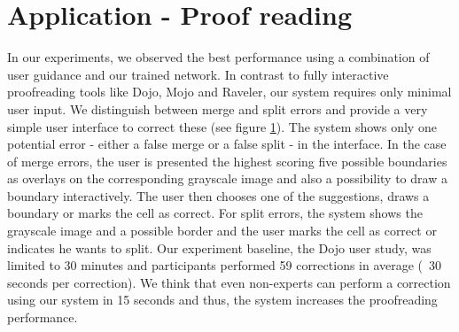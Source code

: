 \section{Application - Proof reading}

In our experiments, we observed the best performance using a combination of user guidance and our trained network. In contrast to fully interactive proofreading tools like Dojo, Mojo and Raveler, our system requires only minimal user input. We distinguish between merge and split errors and provide a very simple user interface to correct these (see figure \ref{fig:system}).
The system shows only one potential error - either a false merge or a false split - in the interface. In the case of merge errors, the user is presented the highest scoring five possible boundaries as overlays on the corresponding grayscale image and also a possibility to draw a boundary interactively. The user then chooses one of the suggestions, draws a boundary or marks the cell as correct.  For split errors, the system shows the grayscale image and a possible border and the user marks the cell as correct or indicates he wants to split. Our experiment baseline, the Dojo user study, was limited to 30 minutes and participants performed 59 corrections in average (~30 seconds per correction). We think that even non-experts can perform a correction using our system in 15 seconds and thus, the system increases the proofreading performance.

\begin{figure}
\caption{}
\label{fig:system}
\end{figure}